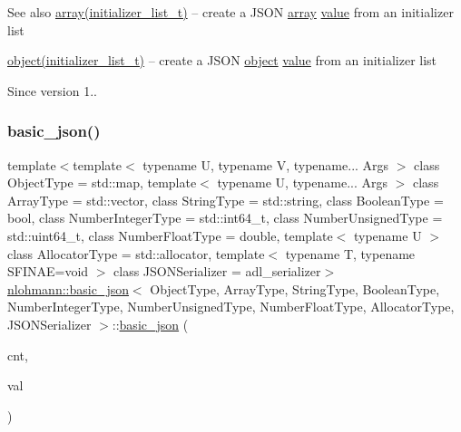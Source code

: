 \begin{DoxySeeAlso}{See also}
\mbox{\hyperlink{classnlohmann_1_1basic__json_aa80485befaffcadaa39965494e0b4d2e}{array(initializer\+\_\+list\+\_\+t)}} -- create a J\+S\+ON \mbox{\hyperlink{classnlohmann_1_1basic__json_aa80485befaffcadaa39965494e0b4d2e}{array}} \mbox{\hyperlink{classnlohmann_1_1basic__json_adcf8ca5079f5db993820bf50036bf45d}{value}} from an initializer list 

\mbox{\hyperlink{classnlohmann_1_1basic__json_aa13f7c0615867542ce80337cbcf13ada}{object(initializer\+\_\+list\+\_\+t)}} -- create a J\+S\+ON \mbox{\hyperlink{classnlohmann_1_1basic__json_aa13f7c0615867542ce80337cbcf13ada}{object}} \mbox{\hyperlink{classnlohmann_1_1basic__json_adcf8ca5079f5db993820bf50036bf45d}{value}} from an initializer list
\end{DoxySeeAlso}
\begin{DoxySince}{Since}
version 1.. 
\end{DoxySince}
\mbox{\label{classnlohmann_1_1basic__json_ab6816ae5100409254ed0a8bc21c387bb}} 
\subsubsection{\texorpdfstring{basic\+\_\+json()}{basic\_json()}\hspace{0.1cm}{\footnotesize\ttfamily [5/8]}}
{\footnotesize\ttfamily template$<$template$<$ typename U, typename V, typename... Args $>$ class Object\+Type = std\+::map, template$<$ typename U, typename... Args $>$ class Array\+Type = std\+::vector, class String\+Type  = std\+::string, class Boolean\+Type  = bool, class Number\+Integer\+Type  = std\+::int64\+\_\+t, class Number\+Unsigned\+Type  = std\+::uint64\+\_\+t, class Number\+Float\+Type  = double, template$<$ typename U $>$ class Allocator\+Type = std\+::allocator, template$<$ typename T, typename S\+F\+I\+N\+A\+E=void $>$ class J\+S\+O\+N\+Serializer = adl\+\_\+serializer$>$ \\
\mbox{\hyperlink{classnlohmann_1_1basic__json}{nlohmann\+::basic\+\_\+json}}$<$ Object\+Type, Array\+Type, String\+Type, Boolean\+Type, Number\+Integer\+Type, Number\+Unsigned\+Type, Number\+Float\+Type, Allocator\+Type, J\+S\+O\+N\+Serializer $>$\+::\mbox{\hyperlink{classnlohmann_1_1basic__json}{basic\+\_\+json}} (\begin{DoxyParamCaption}\item[{\mbox{\hyperlink{classnlohmann_1_1basic__json_a39f2cd0b58106097e0e67bf185cc519b}{size\+\_\+type}}}]{cnt,  }\item[{const \mbox{\hyperlink{classnlohmann_1_1basic__json}{basic\+\_\+json}}$<$ Object\+Type, Array\+Type, String\+Type, Boolean\+Type, Number\+Integer\+Type, Number\+Unsigned\+Type, Number\+Float\+Type, Allocator\+Type, J\+S\+O\+N\+Serializer $>$ \&}]{val }\end{DoxyParamCaption})\hspace{0.3cm}{\ttfamily [inline]}}



